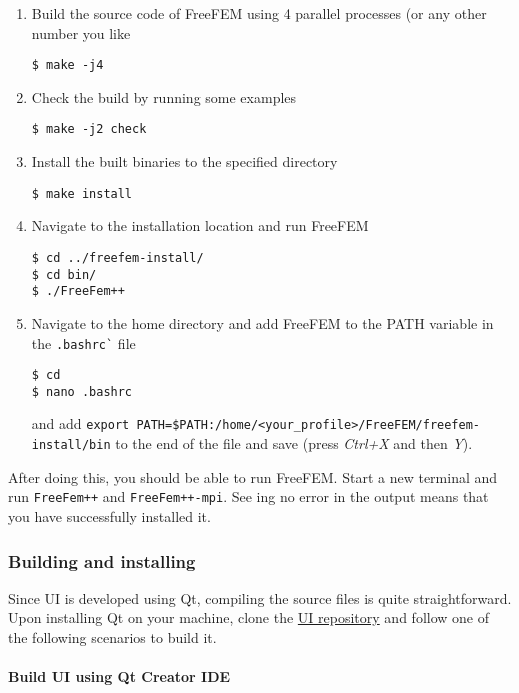 \begin{enumerate}
\item Build the source code of FreeFEM using 4 parallel processes (or any other number you like
\begin{verbatim}
$ make -j4
\end{verbatim}

\item Check the build by running some examples
\begin{verbatim}
$ make -j2 check
\end{verbatim}

\item Install the built binaries to the specified directory
\begin{verbatim}
$ make install
\end{verbatim}

\item Navigate to the installation location and run FreeFEM
\begin{verbatim}
$ cd ../freefem-install/
$ cd bin/
$ ./FreeFem++
\end{verbatim}

\item Navigate to the home directory and add FreeFEM to the PATH variable in the \verb|.bashrc`| file
\begin{verbatim}
$ cd
$ nano .bashrc
\end{verbatim}
and add \verb|export PATH=$PATH:/home/<your_profile>/FreeFEM/freefem-install/bin| to the end of the file and save (press \textit{Ctrl+X} and then \textit{Y}).

\end{enumerate}

After doing this, you should be able to run FreeFEM. Start a new terminal and run \verb|FreeFem++| and \verb|FreeFem++-mpi|. See ing no error in the output means that you have successfully installed it.

\subsubsection{Building and installing \biodeg{}} \label{sec:build_biodeg}

Since \biodeg{} UI is developed using Qt, compiling the source files is quite straightforward. Upon installing Qt on your machine, clone the \href{https://github.com/mbarzegary/BioDeg-UI}{\biodeg{} UI repository} and follow one of the following scenarios to build it. 

\paragraph{Build \biodeg{} UI using Qt Creator IDE}

